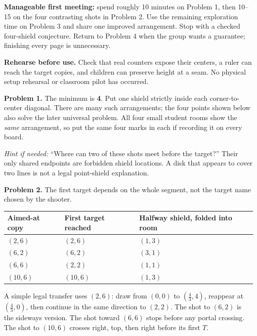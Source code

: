 \documentclass[11pt,letterpaper]{article}
\newcommand{\sectiontitle}[1]{\par\vspace{4pt}{\large\bfseries #1}\par}
\newcommand{\answer}[1]{\par\vspace{3pt}\textbf{Problem #1.} }
\begin{document}
\textbf{Manageable first meeting:} spend roughly 10 minutes on Problem 1, then 10--15 on the four contrasting shots in Problem 2. Use the remaining exploration time on Problem 3 and share one improved arrangement. Stop with a checked four-shield conjecture. Return to Problem 4 when the group wants a guarantee; finishing every page is unnecessary.

\textbf{Rehearse before use.} Check that real counters expose their centers, a ruler can reach the target copies, and children can preserve height at a seam. No physical setup rehearsal or classroom pilot has occurred.
\newpage
\sectiontitle{Answers and optional hints}
\answer{1} The minimum is \textbf{4}. Put one shield strictly inside each corner-to-center diagonal. There are many such arrangements; the four points shown below also solve the later universal problem. All four small student rooms show the \emph{same} arrangement, so put the same four marks in each if recording it on every board.

\begin{center}
\end{center}
\textit{Hint if needed:} ``Where can two of these shots meet before the target?'' Their only shared endpoints are forbidden shield locations. A disk that appears to cover two lines is not a legal point-shield explanation.

\answer{2} The first target depends on the whole segment, not the target name chosen by the shooter.
\begin{center}
\renewcommand{\arraystretch}{1.32}
\begin{tabular}{@{}lll@{}}
Aimed-at copy & First target reached & Halfway shield, folded into room\\\hline
$(2,6)$ & $(2,6)$ & $(1,3)$\\
$(6,2)$ & $(6,2)$ & $(3,1)$\\
$(6,6)$ & $(2,2)$ & $(1,1)$\\
$(10,6)$ & $(10,6)$ & $(1,3)$
\end{tabular}
\end{center}
A simple legal transfer uses $(2,6)$: draw from $(0,0)$ to $(\frac43,4)$, reappear at $(\frac43,0)$, then continue in the same direction to $(2,2)$. The shot to $(6,2)$ is the sideways version. The shot toward $(6,6)$ stops before any portal crossing. The shot to $(10,6)$ crosses right, top, then right before its first $T$.
\end{document}
